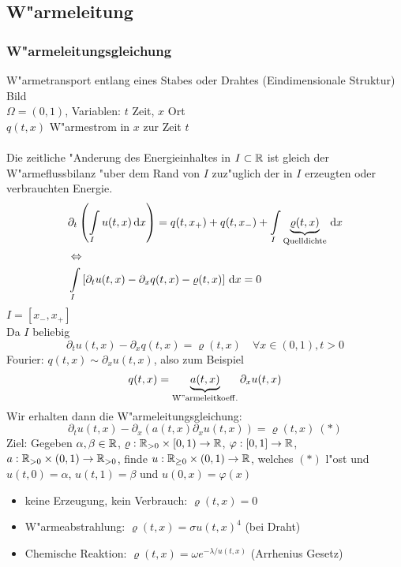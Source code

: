 \documentclass{scrartcl}
\begin{document}
\subsection{W"armeleitung} 

\subsubsection{W"armeleitungsgleichung}

W"armetransport entlang eines Stabes oder Drahtes (Eindimensionale Struktur) \\
Bild \\
$\Omega = (0,1)$, Variablen: $t$ Zeit, $x$ Ort \\
$q(t,x)$ W"armestrom in $x$ zur Zeit $t$ \\

 \\
Die zeitliche "Anderung des Energieinhaltes in $I \subset \mathbb{R}$ ist gleich der W"armeflussbilanz "uber dem Rand von $I$ zuz"uglich der in $I$ erzeugten oder verbrauchten Energie. \\
\begin{eqnarray*}
& \partial_t \left( \int\limits_{I} u(t,x) \, \mathrm{d} x \right) = q(t,x_+) + q(t,x_-) + \int\limits_{I} \underbrace{\varrho(t,x)}_{\mathrm{Quelldichte}} \, \mathrm{d} x  \\
& \Leftrightarrow \\
& \int\limits_{I} \left[ \partial_t u(t,x) - \partial_x q(t,x) - \varrho(t,x) \right] \, \mathrm{d} x = 0
\end{eqnarray*}
$I = [x_-, x_+]$ \\
Da $I$ beliebig 
$$\partial_t u(t,x) - \partial_x q(t,x) = \varrho(t,x) \quad \forall x \in (0,1), t > 0$$
Fourier: $q(t,x) \sim\partial_x u(t,x)$, also zum Beispiel
$$q(t,x) = \underbrace{a(t,x)}_{\mathrm{W"armeleitkoeff.}} \partial_x u(t,x)$$
Wir erhalten dann die W"armeleitungsgleichung:
$$ \partial_t u(t,x) - \partial_x(a(t,x) \partial_x u(t,x)) = \varrho(t,x) \ (*)$$
Ziel: Gegeben $\alpha, \beta \in \mathbb{R}$, $\varrho: \mathbb{R}_{>0} \times [0,1) \rightarrow \mathbb{R}$, $\varphi: [0,1] \rightarrow \mathbb{R}$, $a: \mathbb{R}_{>0} \times (0,1) \rightarrow \mathbb{R}_{>0}$, finde $u: \mathbb{R}_{\geq 0} \times (0,1) \rightarrow \mathbb{R}$, welches $(*)$ l"ost und $u(t,0) = \alpha$, $u(t,1) = \beta$ und $u(0,x) = \varphi(x)$ \\

\begin{itemize}
\item keine Erzeugung, kein Verbrauch: $\varrho(t,x) = 0$ 
\item W"armeabstrahlung: $\varrho(t,x) = \sigma u(t,x)^4$ (bei Draht)
\item Chemische Reaktion: $\varrho(t,x) = \omega e^{-\lambda/u(t,x)}$ (Arrhenius Gesetz)
\end{itemize}
\end{document}

